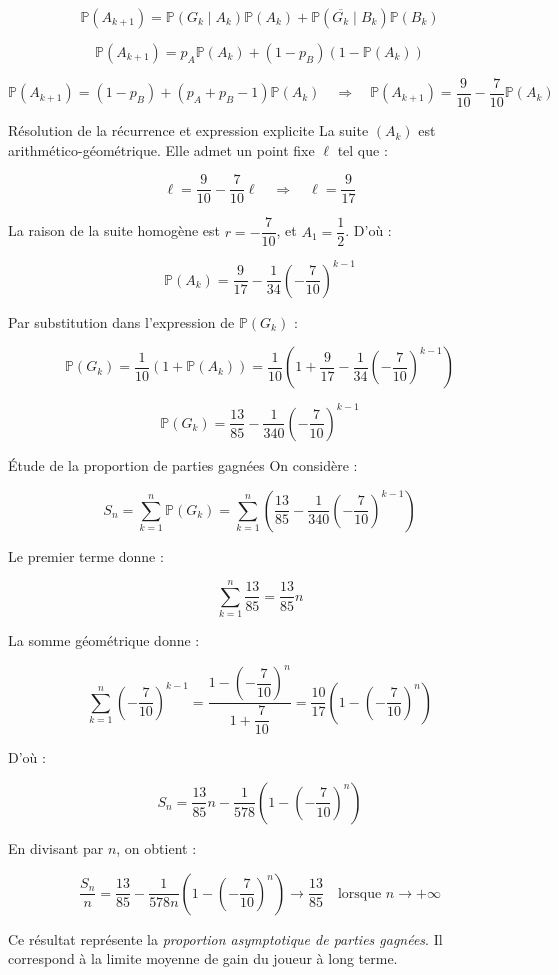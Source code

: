 \documentclass[10pt,a4paper]{article}
\begin{document}
\[
\mathbb{P}(A_{k+1}) = \mathbb{P}(G_k \mid A_k)\mathbb{P}(A_k) + \mathbb{P}(\overline{G_k} \mid B_k) \mathbb{P}(B_k)
\]

\[
\mathbb{P}(A_{k+1}) = p_A \mathbb{P}(A_k) + (1 - p_B)(1 - \mathbb{P}(A_k))
\]

\[
\boxed{\mathbb{P}(A_{k+1}) = (1 - p_B) + (p_A + p_B - 1) \mathbb{P}(A_k)}
\quad \Rightarrow \quad
\boxed{\mathbb{P}(A_{k+1}) = \dfrac{9}{10} - \dfrac{7}{10} \mathbb{P}(A_k)}
\]


\q Résolution de la récurrence et expression explicite
La suite \( (A_k) \) est arithmético-géométrique. Elle admet un point fixe \( \ell \) tel que :

\[
\ell = \dfrac{9}{10} - \dfrac{7}{10} \ell \quad \Rightarrow \quad \boxed{\ell = \dfrac{9}{17}}
\]

La raison de la suite homogène est \( r = -\dfrac{7}{10} \), et \( A_1 = \dfrac{1}{2} \). D'où :

\[
\boxed{\mathbb{P}(A_k) = \dfrac{9}{17} - \dfrac{1}{34} \left( -\dfrac{7}{10} \right)^{k - 1}}
\]

Par substitution dans l'expression de \( \mathbb{P}(G_k) \) :

\[
\mathbb{P}(G_k) = \dfrac{1}{10} \left( 1 + \mathbb{P}(A_k) \right)
= \dfrac{1}{10} \left( 1 + \dfrac{9}{17} - \dfrac{1}{34} \left( -\dfrac{7}{10} \right)^{k - 1} \right)
\]

\[
\boxed{\mathbb{P}(G_k) = \dfrac{13}{85} - \dfrac{1}{340} \left( -\dfrac{7}{10} \right)^{k - 1}}
\]


\q Étude de la proportion de parties gagnées
On considère :

\[
S_n = \sum_{k = 1}^{n} \mathbb{P}(G_k)
= \sum_{k = 1}^{n} \left( \dfrac{13}{85} - \dfrac{1}{340} \left( -\dfrac{7}{10} \right)^{k - 1} \right)
\]

Le premier terme donne :

\[
\sum_{k = 1}^{n} \dfrac{13}{85} = \dfrac{13}{85} n
\]

La somme géométrique donne :

\[
\sum_{k = 1}^{n} \left( -\dfrac{7}{10} \right)^{k - 1}
= \dfrac{1 - \left( -\dfrac{7}{10} \right)^n}{1 + \dfrac{7}{10}} = \dfrac{10}{17} \left( 1 - \left( -\dfrac{7}{10} \right)^n \right)
\]

D'où :

\[
\boxed{S_n = \dfrac{13}{85} n - \dfrac{1}{578} \left( 1 - \left( -\dfrac{7}{10} \right)^n \right)}
\]

\medskip

En divisant par \( n \), on obtient :

\[
\boxed{\dfrac{S_n}{n} = \dfrac{13}{85} - \dfrac{1}{578 n} \left( 1 - \left( -\dfrac{7}{10} \right)^n \right) \longrightarrow \dfrac{13}{85}}
\quad \text{lorsque } n \to +\infty
\]

Ce résultat représente la \emph{proportion asymptotique de parties gagnées}. Il correspond à la
limite moyenne de gain du joueur à long terme.
\end{document}
